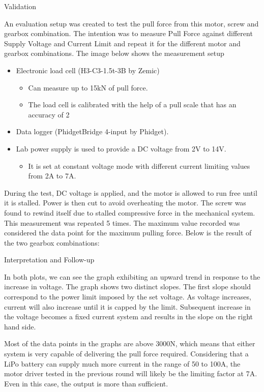 Validation

An evaluation setup was created to test the pull force from this motor, screw and gearbox combination. The intention was to measure Pull Force against different Supply Voltage and Current Limit and repeat it for the different motor and gearbox combinations.
The image below shows the measurement setup
\begin{itemize}
    \item Electronic load cell (H3-C3-1.5t-3B by Zemic)
    \begin{itemize}
        \item Can measure up to 15kN of pull force. 
        \item The load cell is calibrated with the help of a pull scale that has an accuracy of 2%
    \end{itemize}
    \item Data logger (PhidgetBridge 4-input by Phidget). 
    \item Lab power supply is used to provide a DC voltage from 2V to 14V. 
    \begin{itemize}
        \item It is set at constant voltage mode with different current limiting values from 2A to 7A. 
    \end{itemize}
\end{itemize}

During the test, DC voltage is applied, and the motor is allowed to run free until it is stalled. Power is then cut to avoid overheating the motor. The screw was found to rewind itself due to stalled compressive force in the mechanical system. This measurement was repeated 5 times. The maximum value recorded was considered the data point for the maximum pulling force.
Below is the result of the two gearbox combinations:

Interpretation and Follow-up


In both plots, we can see the graph exhibiting an upward trend in response to the increase in voltage. The graph shows two distinct slopes. The first slope should correspond to the power limit imposed by the set voltage. As voltage increases, current will also increase until it is capped by the limit. Subsequent increase in the voltage becomes a fixed current system and results in the slope on the right hand side.

Most of the data points in the graphs are above 3000N, which means that either system is very capable of delivering the pull force required. Considering that a LiPo battery can supply much more current in the range of 50 to 100A, the motor driver tested in the previous round will likely be the limiting factor at 7A. Even in this case, the output is more than sufficient. 

